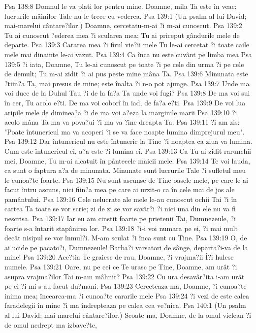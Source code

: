 Psa 138:8  Domnul le va plati lor pentru mine. Doamne, mila Ta este în veac; lucrurile mâinilor Tale nu le trece cu vederea.
Psa 139:1  (Un psalm al lui David; mai-marelui cântare?ilor.) Doamne, cercetatu-m-ai ?i m-ai cunoscut.
Psa 139:2  Tu ai cunoscut ?ederea mea ?i scularea mea; Tu ai priceput gândurile mele de departe.
Psa 139:3  Cararea mea ?i firul vie?ii mele Tu le-ai cercetat ?i toate caile mele mai dinainte le-ai vazut.
Psa 139:4  Ca înca nu este cuvânt pe limba mea
Psa 139:5  ?i iata, Doamne, Tu le-ai cunoscut pe toate ?i pe cele din urma ?i pe cele de demult; Tu m-ai zidit ?i ai pus peste mine mâna Ta.
Psa 139:6  Minunata este ?tiin?a Ta, mai presus de mine; este înalta ?i n-o pot ajunge.
Psa 139:7  Unde ma voi duce de la Duhul Tau ?i de la fa?a Ta unde voi fugi?
Psa 139:8  De ma voi sui în cer, Tu acolo e?ti. De ma voi coborî în iad, de fa?a e?ti.
Psa 139:9  De voi lua aripile mele de diminea?a ?i de ma voi a?eza la marginile marii
Psa 139:10  ?i acolo mâna Ta ma va pova?ui ?i ma va ?ine dreapta Ta.
Psa 139:11  ?i am zis: "Poate întunericul ma va acoperi ?i se va face noapte lumina dimprejurul meu".
Psa 139:12  Dar întunericul nu este întuneric la Tine ?i noaptea ca ziua va lumina. Cum este întunericul ei, a?a este ?i lumina ei.
Psa 139:13  Ca Tu ai zidit rarunchii mei, Doamne, Tu m-ai alcatuit în pântecele maicii mele.
Psa 139:14  Te voi lauda, ca sunt o faptura a?a de minunata. Minunate sunt lucrurile Tale ?i sufletul meu le cunoa?te foarte.
Psa 139:15  Nu sunt ascunse de Tine oasele mele, pe care le-ai facut întru ascuns, nici fiin?a mea pe care ai urzit-o ca în cele mai de jos ale pamântului.
Psa 139:16  Cele nelucrate ale mele le-au cunoscut ochii Tai ?i în cartea Ta toate se vor scrie; zi de zi se vor savâr?i ?i nici una din ele nu va fi nescrisa.
Psa 139:17  Iar eu am cinstit foarte pe prietenii Tai, Dumnezeule, ?i foarte s-a întarit stapânirea lor.
Psa 139:18  ?i-i voi numara pe ei, ?i mai mult decât nisipul se vor înmul?i. M-am sculat ?i înca sunt cu Tine.
Psa 139:19  O, de ai ucide pe pacato?i, Dumnezeule! Barba?i varsatori de sânge, departa?i-va de la mine!
Psa 139:20  Ace?tia Te graiesc de rau, Doamne, ?i vrajma?ii Î?i hulesc numele.
Psa 139:21  Oare, nu pe cei ce Te urasc pe Tine, Doamne, am urât ?i asupra vrajma?ilor Tai m-am mâhnit?
Psa 139:22  Cu ura desavâr?ita i-am urât pe ei ?i mi s-au facut du?mani.
Psa 139:23  Cerceteaza-ma, Doamne, ?i cunoa?te inima mea; încearca-ma ?i cunoa?te cararile mele
Psa 139:24  ?i vezi de este calea faradelegii în mine ?i ma îndrepteaza pe calea cea ve?nica.
Psa 140:1  (Un psalm al lui David; mai-marelui cântare?ilor.) Scoate-ma, Doamne, de la omul viclean ?i de omul nedrept ma izbave?te,
